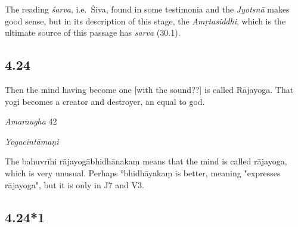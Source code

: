 \begin{ekdosis}
\begin{philcomm}[hp04_023]
The reading \emph{śarva}, i.e.~Śiva, found in some testimonia and the \emph{Jyotsnā} makes good sense, but in its description of this stage, the \emph{Amṛtasiddhi}, which is the ultimate source of this passage has \emph{sarva} (30.1).
\end{philcomm}

\subsection*{4.24}
\begin{translation}[hp04_024]
Then the mind having become one [with the sound??] is called Rājayoga. That yogi becomes a creator and destroyer, an equal to god.%
\end{translation}

\begin{sources}[hp04_024]
\emph{Amaraugha} 42
\begin{versinnote}
\tl{\var{rājayogābhidhānakam ] Ga Ba Ad Gb Ed ; rājayogo 'bhidhīyate Ae}\\!}
\end{versinnote}
\end{sources}

\begin{testimonia}[hp04_024]
\emph{Yogacintāmaṇi}
\begin{versinnote}
\end{versinnote}
\end{testimonia}

\begin{philcomm}[hp04_024]
The bahuvrīhi rājayogābhidhānakaṃ means that the mind is called rājayoga, which is very unusual. Perhaps °bhidhāyakaṃ is better, meaning "expresses rājayoga", but it is only in J7 and V3.


\end{philcomm}

\subsection*{4.24*1}


\end{ekdosis}
